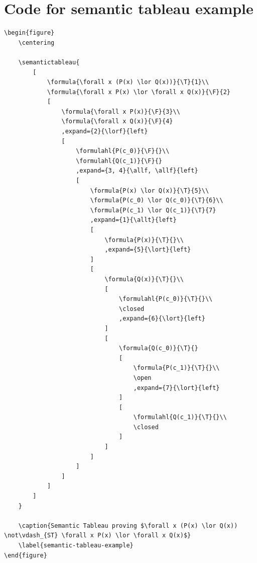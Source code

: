 \section{Code for semantic tableau example}
\label{code-semantic-tableau-example}
\begin{lstlisting}
\begin{figure}
    \centering

    \semantictableau{
        [
            \formula{\forall x (P(x) \lor Q(x))}{\T}{1}\\
            \formula{\forall x P(x) \lor \forall x Q(x)}{\F}{2}
            [
                \formula{\forall x P(x)}{\F}{3}\\
                \formula{\forall x Q(x)}{\F}{4}
                ,expand={2}{\lorf}{left}
                [
                    \formulahl{P(c_0)}{\F}{}\\
                    \formulahl{Q(c_1)}{\F}{}
                    ,expand={3, 4}{\allf, \allf}{left}
                    [
                        \formula{P(x) \lor Q(x)}{\T}{5}\\
                        \formula{P(c_0) \lor Q(c_0)}{\T}{6}\\
                        \formula{P(c_1) \lor Q(c_1)}{\T}{7}
                        ,expand={1}{\allt}{left}
                        [
                            \formula{P(x)}{\T}{}\\
                            ,expand={5}{\lort}{left}
                        ]
                        [
                            \formula{Q(x)}{\T}{}\\
                            [
                                \formulahl{P(c_0)}{\T}{}\\
                                \closed
                                ,expand={6}{\lort}{left}
                            ]
                            [
                                \formula{Q(c_0)}{\T}{}
                                [
                                    \formula{P(c_1)}{\T}{}\\
                                    \open
                                    ,expand={7}{\lort}{left}
                                ]
                                [
                                    \formulahl{Q(c_1)}{\T}{}\\
                                    \closed
                                ]
                            ]
                        ]
                    ]
                ]
            ]
        ]
    }
    
    \caption{Semantic Tableau proving $\forall x (P(x) \lor Q(x)) \not\vdash_{ST} \forall x P(x) \lor \forall x Q(x)$}
    \label{semantic-tableau-example}
\end{figure}
\end{lstlisting}


